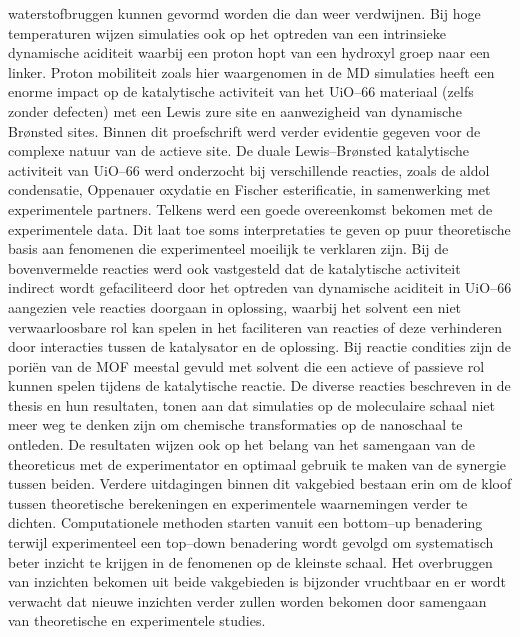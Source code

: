 waterstofbruggen kunnen gevormd worden die dan weer verdwijnen. Bij hoge temperaturen wijzen simulaties ook op het optreden 
van een intrinsieke dynamische aciditeit waarbij een proton hopt van een hydroxyl groep naar een linker. Proton mobiliteit zoals 
hier waargenomen in de MD simulaties heeft een enorme impact op de katalytische
activiteit van het UiO--66 materiaal (zelfs zonder defecten) met een Lewis zure
site en aanwezigheid van dynamische Br\o{}nsted sites.
\npar
Binnen dit proefschrift
werd verder evidentie gegeven voor de complexe natuur van de actieve site. De
duale Lewis--Br\o{}nsted katalytische activiteit van UiO--66 werd onderzocht bij
verschillende reacties, zoals de aldol condensatie, Oppenauer oxydatie en Fischer esterificatie, in samenwerking met experimentele partners. 
Telkens werd een goede overeenkomst bekomen met de experimentele data. Dit laat toe soms interpretaties te geven op puur theoretische basis 
aan fenomenen die experimenteel moeilijk te verklaren zijn. Bij de bovenvermelde reacties werd ook vastgesteld dat de katalytische activiteit 
indirect wordt gefaciliteerd door het optreden van dynamische aciditeit in
UiO--66 aangezien vele reacties doorgaan in oplossing, waarbij het solvent een
niet verwaarloosbare rol kan spelen in het faciliteren van reacties of deze verhinderen 
door interacties tussen de katalysator en de oplossing. Bij reactie condities
zijn de pori\"en van de MOF meestal gevuld met solvent die een actieve of
passieve rol kunnen spelen tijdens de katalytische reactie. De diverse reacties beschreven in de thesis en hun resultaten, 
tonen aan dat simulaties op de moleculaire schaal niet meer weg te denken zijn om chemische transformaties op de nanoschaal te ontleden. 
De resultaten wijzen ook op het belang van het samengaan van de theoreticus met de experimentator en optimaal gebruik te maken van de synergie tussen beiden. 
Verdere uitdagingen binnen dit vakgebied bestaan erin om de kloof tussen theoretische berekeningen en experimentele waarnemingen verder te dichten. 
Computationele methoden starten vanuit een bottom--up benadering terwijl
experimenteel een top--down benadering wordt gevolgd om systematisch beter
inzicht te krijgen in de fenomenen op de kleinste schaal. Het overbruggen van inzichten bekomen uit beide vakgebieden is bijzonder
vruchtbaar en er wordt verwacht dat nieuwe inzichten verder zullen worden
bekomen door samengaan van theoretische en experimentele studies.

